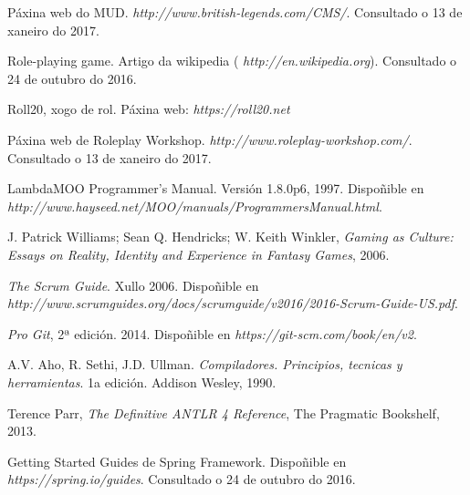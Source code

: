 

\begin{thebibliography}{99}

 Páxina web do MUD. \textit{ http://www.british-legends.com/CMS/}.
Consultado o 13 de xaneiro do 2017.

 Role-playing game. Artigo da wikipedia (\textit{
http://en.wikipedia.org}). Consultado o 24 de outubro do 2016.

 Roll20, xogo de rol. Páxina web: \textit{ https://roll20.net}

 Páxina web de Roleplay Workshop. \textit{
http://www.roleplay-workshop.com/}. Consultado o 13 de xaneiro do 2017.

 LambdaMOO Programmer's Manual. Versión 1.8.0p6, 1997.
Dispoñible en \textit{ http://www.hayseed.net/MOO/manuals/ProgrammersManual.html}.

 J. Patrick Williams; Sean Q. Hendricks; W. Keith
Winkler, \textit{ Gaming as Culture: Essays on Reality, Identity and Experience in
Fantasy Games}, 2006.

 \textit{ The Scrum Guide}. Xullo 2006. Dispoñible en \textit{
http://www.scrumguides.org/docs/scrumguide/v2016/2016-Scrum-Guide-US.pdf}.

 \textit{ Pro Git}, 2ª edición. 2014. Dispoñible en \textit{
https://git-scm.com/book/en/v2}.

 A.V. Aho, R. Sethi, J.D. Ullman. \textit{Compiladores.
Principios, tecnicas y herramientas}. 1a edición. Addison Wesley, 1990.

 Terence Parr, \textit{ The Definitive ANTLR 4 Reference}, The
Pragmatic Bookshelf, 2013.



 Getting Started Guides de Spring Framework. Dispoñible en
\textit{ https://spring.io/guides}. Consultado o 24 de outubro do 2016.

\end{thebibliography}